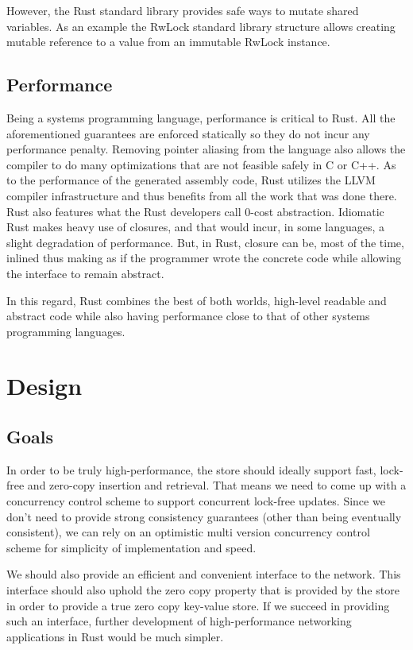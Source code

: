 \documentclass[11pt]{article}
\begin{document}
However, the Rust standard library provides safe ways to mutate shared
variables. As an example the RwLock standard library structure allows
creating mutable reference to a value from an immutable RwLock instance.

\subsection{Performance}

Being a systems programming language, performance is critical to
Rust. All the aforementioned guarantees are enforced statically so
they do not incur any performance penalty. Removing pointer aliasing
from the language also allows the compiler to do many optimizations
that are not feasible safely in C or C++. As to the performance of the
generated assembly code, Rust utilizes the LLVM compiler
infrastructure and thus benefits from all the work that was done
there. Rust also features what the Rust developers call 0-cost
abstraction. Idiomatic Rust makes heavy use of closures, and that
would incur, in some languages, a slight degradation of
performance. But, in Rust, closure can be, most of the time, inlined
thus making as if the programmer wrote the concrete code while
allowing the interface to remain abstract.

In this regard, Rust combines the best of both worlds, high-level
readable and abstract code while also having performance close to that
of other systems programming languages.

\section{Design}

\subsection{Goals} \label{design-goals}

In order to be truly high-performance, the store should ideally
support fast, lock-free and zero-copy insertion and retrieval. That
means we need to come up with a concurrency control scheme to support
concurrent lock-free updates. Since we don't need to provide strong
consistency guarantees (other than being eventually consistent), we
can rely on an optimistic multi version concurrency control scheme for
simplicity of implementation and speed.

We should also provide an efficient and convenient interface to the
network. This interface should also uphold the zero copy property that
is provided by the store in order to provide a true zero copy
key-value store. If we succeed in providing such an interface, further
development of high-performance networking applications in Rust would
be much simpler.
\end{document}

